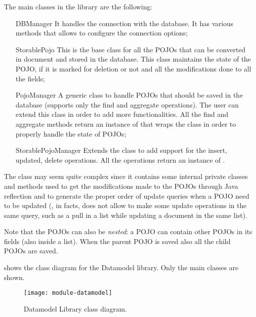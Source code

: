 The main classes in the library are the following:
\begin{itemize}
	\item[DBManager] It handles the connection with the database. It has
		various methods that allows to configure the connection options;
	\item[StorablePojo] This is the base class for all the POJOs that can be
		converted in document and stored in the database. This class
		maintains the state of the POJO, if it is marked for deletion or
		not and all the modifications done to all the fields;
	\item[PojoManager] A generic class to handle POJOs that should
		 be saved in the database (supports only the find
		and aggregate operations). The user can extend this class in
		order to add more functionalities. All the find and aggregate
		methods return an instance of  that wraps the
		 class in order to properly handle the state
		of POJOs;
	\item[StorablePojoManager] Extends the  class to add
		support for the insert, updated, delete operations. All the
		operations return an instance of .
\end{itemize}
The  class may seem quite complex since it contains
some internal private classes and methods used to get the modifications made to
the POJOs through Java reflection and to generate the proper order of update
queries when a POJO need to be updated (\mongodb{}, in facts, does not allow to
make some update operations in the same query, such as a pull in a list while
updating a document in the same list).

Note that the POJOs can also be \emph{nested}: a POJO can contain other POJOs in
its fields (also inside a list). When the parent POJO is saved also all the
child POJOs are saved.

 shows the class diagram for the Datamodel library. Only
the main classes are shown.

\begin{figure}[htb]
	\texttt{[image: module-datamodel]}
	\caption{Datamodel Library class diagram.}\label{fig:datamodel}
\end{figure}
